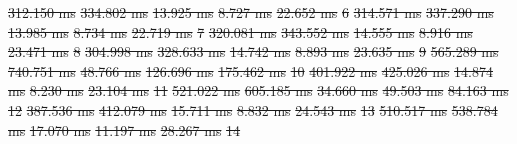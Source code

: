 \documentclass[draft,final]{vutinfth} %
\providecommand{\DIFdeltex}[1]{{\protect\color{red}\sout{#1}}}                      %
\providecommand{\DIFdelFL}[1]{\DIFdel{#1}} %
\providecommand{\DIFdel}[1]{\texorpdfstring{\DIFdeltex{#1}}{}} %
\begin{document}
\DIFdelFL{312.150 ms }%
\DIFdelFL{334.802 ms }%
\DIFdelFL{13.925 ms }%
\DIFdelFL{8.727 ms }%
\DIFdelFL{22.652 ms }%
\DIFdelFL{6 }%
\DIFdelFL{314.571 ms }%
\DIFdelFL{337.290 ms }%
\DIFdelFL{13.985 ms }%
\DIFdelFL{8.734 ms }%
\DIFdelFL{22.719 ms }%
\DIFdelFL{7 }%
\DIFdelFL{320.081 ms }%
\DIFdelFL{343.552 ms }%
\DIFdelFL{14.555 ms }%
\DIFdelFL{8.916 ms }%
\DIFdelFL{23.471 ms }%
\DIFdelFL{8 }%
\DIFdelFL{304.998 ms }%
\DIFdelFL{328.633 ms }%
\DIFdelFL{14.742 ms }%
\DIFdelFL{8.893 ms }%
\DIFdelFL{23.635 ms }%
\DIFdelFL{9 }%
\DIFdelFL{565.289 ms }%
\DIFdelFL{740.751 ms }%
\DIFdelFL{48.766 ms }%
\DIFdelFL{126.696 ms }%
\DIFdelFL{175.462 ms }%
\DIFdelFL{10 }%
\DIFdelFL{401.922 ms }%
\DIFdelFL{425.026 ms }%
\DIFdelFL{14.874 ms }%
\DIFdelFL{8.230 ms }%
\DIFdelFL{23.104 ms }%
\DIFdelFL{11 }%
\DIFdelFL{521.022 ms }%
\DIFdelFL{605.185 ms }%
\DIFdelFL{34.660 ms }%
\DIFdelFL{49.503 ms }%
\DIFdelFL{84.163 ms }%
\DIFdelFL{12 }%
\DIFdelFL{387.536 ms }%
\DIFdelFL{412.079 ms }%
\DIFdelFL{15.711 ms }%
\DIFdelFL{8.832 ms }%
\DIFdelFL{24.543 ms }%
\DIFdelFL{13 }%
\DIFdelFL{510.517 ms }%
\DIFdelFL{538.784 ms }%
\DIFdelFL{17.070 ms }%
\DIFdelFL{11.197 ms }%
\DIFdelFL{28.267 ms }%
\DIFdelFL{14 }%
\end{document}

